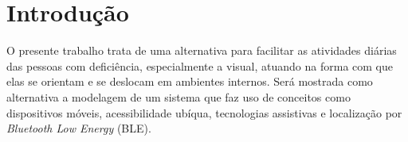 \documentclass[english,brazilian]{UNISINOSmonografia}
\begin{document}

\tableofcontents

\chapter{Introdução} %
O presente trabalho trata de uma alternativa para facilitar as atividades diárias das pessoas com deficiência, especialmente a visual, atuando na forma com que elas se orientam e se deslocam em ambientes internos.
Será mostrada como alternativa a modelagem de um sistema que faz uso de conceitos como dispositivos móveis, acessibilidade ubíqua, tecnologias assistivas e localização por \textit{Bluetooth Low Energy} (BLE).
\end{document}

